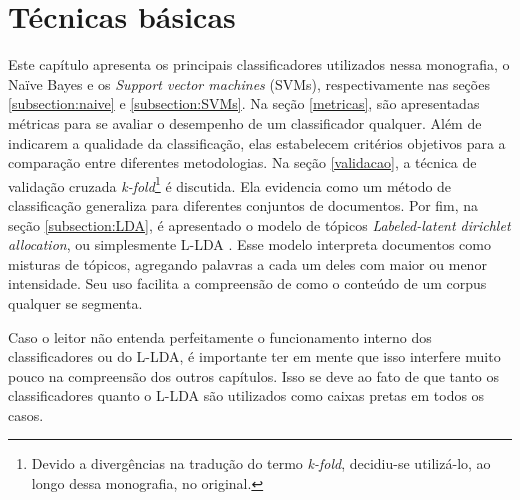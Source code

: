 \chapter{Técnicas básicas}
\label{basicos}

Este capítulo apresenta os principais classificadores utilizados nessa monografia, o Naïve Bayes e os \emph{Support vector machines} (SVMs), respectivamente nas seções \ref{subsection:naive} e \ref{subsection:SVMs}. Na seção \ref{metricas}, são apresentadas métricas para se avaliar o desempenho de um classificador qualquer. Além de indicarem a qualidade da classificação, elas estabelecem critérios objetivos para a comparação entre diferentes metodologias. Na seção \ref{validacao}, a técnica de validação cruzada \emph{k-fold}\footnote{Devido a divergências na tradução do termo \emph{k-fold}, decidiu-se utilizá-lo, ao longo dessa monografia, no original.} é discutida. Ela evidencia como um método de classificação generaliza para diferentes conjuntos de documentos. Por fim, na seção \ref{subsection:LDA}, é apresentado o modelo de tópicos \emph{Labeled-latent dirichlet allocation}, ou simplesmente L-LDA \cite{llda}. Esse modelo interpreta documentos como misturas de tópicos, agregando palavras a cada um deles com maior ou menor intensidade. Seu uso facilita a compreensão de como o conteúdo de um corpus qualquer se segmenta. %

Caso o leitor não entenda perfeitamente o funcionamento interno dos classificadores ou do L-LDA, é importante ter em mente que isso interfere muito pouco na compreensão dos outros capítulos. Isso se deve ao fato de que tanto os classificadores quanto o L-LDA são utilizados como caixas pretas em todos os casos.






